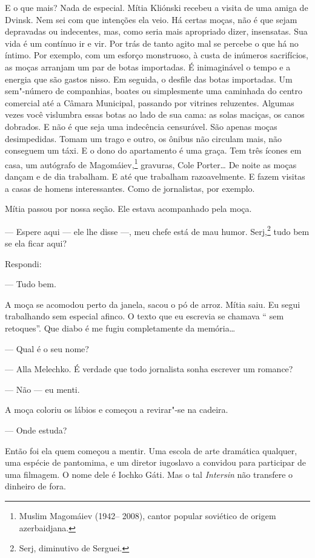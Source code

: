 E o que mais? Nada de especial. Mítia Kliónski recebeu a visita de uma
amiga de Dvinsk. Nem sei com que intenções ela veio. Há certas moças,
não é que sejam depravadas ou indecentes, mas, como seria mais
apropriado dizer, insensatas. Sua vida é um contínuo ir e vir. Por trás
de tanto agito mal se percebe o que há no íntimo. Por exemplo, com um
esforço monstruoso, à custa de inúmeros sacrifícios, as moças arranjam
um par de botas importadas. É inimaginável o tempo e a energia que são
gastos nisso. Em seguida, o desfile das botas importadas. Um sem"-número
de companhias, boates ou simplesmente uma caminhada do centro comercial
até a Câmara Municipal, passando por vitrines reluzentes. Algumas vezes
você vislumbra essas botas ao lado de sua cama: as solas maciças, os
canos dobrados. E não é que seja uma indecência censurável. São apenas
moças desimpedidas. Tomam um trago e outro, os ônibus não circulam mais,
não conseguem um táxi. E o dono do apartamento é uma graça. Tem três
ícones em casa, um autógrafo de Magomáiev,\footnote{Muslim Magomáiev
  (1942-- 2008), cantor popular soviético de origem azerbaidjana.}
gravuras, Cole Porter\ldots{} De noite as moças dançam e de dia trabalham. E
até que trabalham razoavelmente. E fazem visitas a casas de homens
interessantes. Como de jornalistas, por exemplo.

Mítia passou por nossa seção. Ele estava acompanhado pela moça.

--- Espere aqui --- ele lhe disse ---, meu chefe está de mau humor.
Serj,\footnote{Serj, diminutivo de Serguei.} tudo bem se ela ficar aqui?

Respondi:

--- Tudo bem.

A moça se acomodou perto da janela, sacou o pó de arroz. Mítia saiu. Eu
segui trabalhando sem especial afinco. O texto que eu escrevia se
chamava `` sem retoques''. Que diabo é  me fugiu completamente da
memória\ldots{}

--- Qual é o seu nome?

--- Alla Melechko. É verdade que todo jornalista sonha escrever um
romance?

--- Não --- eu menti.

A moça coloriu os lábios e começou a revirar"-se na cadeira.

--- Onde estuda?

Então foi ela quem começou a mentir. Uma escola de arte dramática
qualquer, uma espécie de pantomima, e um diretor iugoslavo a convidou
para participar de uma filmagem. O nome dele é Iochko Gáti. Mas o tal
\emph{Intersin} não transfere o dinheiro de fora.

